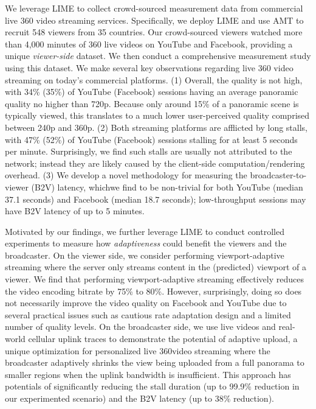 We leverage LIME to collect crowd-sourced measurement data
from commercial live 360\degree{} video streaming services. Specifically,
we deploy LIME and use AMT to recruit 548 viewers from 35 countries.
Our crowd-sourced viewers watched more than 4,000 minutes
of 360\degree{} live videos on YouTube and Facebook, providing a unique
\emph{viewer-side} dataset. We then conduct a comprehensive measurement
study using this dataset. We make several key observations regarding
live 360\degree{} video streaming on today’s commercial platforms. (1) Overall, the quality is not high, with 34\% (35\%) of YouTube
(Facebook) sessions having an average panoramic quality no higher
than 720p. Because only around 15\% of a panoramic scene is typically
viewed, this translates to a much lower user-perceived quality
comprised between 240p and 360p. (2) Both streaming platforms
are afflicted by long stalls, with 47\% (52\%) of YouTube (Facebook)
sessions stalling for at least 5 seconds per minute. Surprisingly, we
find such stalls are usually not attributed to the network; instead
they are likely caused by the client-side computation/rendering
overhead. (3) We develop a novel methodology for measuring the
broadcaster-to-viewer (B2V) latency, whichwe find to be non-trivial
for both YouTube (median 37.1 seconds) and Facebook (median 18.7
seconds); low-throughput sessions may have B2V latency of up to
5 minutes.

Motivated by our findings, we further leverage
LIME to conduct controlled experiments to measure how \emph{adaptiveness} 
could benefit the viewers and
the broadcaster. On the viewer side, we consider performing
viewport-adaptive streaming where the server only streams content
in the (predicted) viewport of a viewer. We find that performing
viewport-adaptive streaming effectively reduces the video encoding
bitrate by 75\% to 80\%. However, surprisingly, doing so does not
necessarily improve the video quality on Facebook and YouTube
due to several practical issues such as cautious rate adaptation design
and a limited number of quality levels. On the broadcaster
side, we use live videos and real-world cellular uplink traces to
demonstrate the potential of adaptive upload, a unique optimization
for personalized live 360\degree video streaming where the broadcaster
adaptively shrinks the view being uploaded from a full panorama
to smaller regions when the uplink bandwidth is insufficient. This
approach has potentials of significantly reducing the stall duration
(up to 99.9\% reduction in our experimented scenario) and the B2V
latency (up to 38\% reduction).

